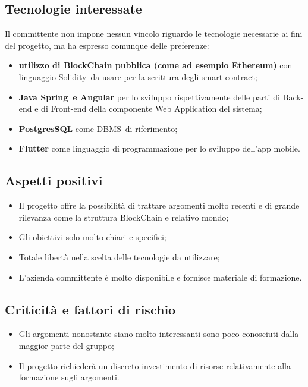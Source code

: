 \subsection{Tecnologie interessate}
Il committente non impone nessun vincolo riguardo le tecnologie necessarie ai fini del progetto, ma ha espresso comunque delle preferenze:
\begin{itemize}
	\item \textbf{utilizzo di BlockChain pubblica (come ad esempio Ethereum\glo)} con linguaggio Solidity\glo\ da usare per la scrittura degli {smart contract}\glo;
	\item \textbf{Java Spring\glo\ e Angular\glo} per lo sviluppo rispettivamente delle parti di Back-end e di Front-end della componente Web Application del sistema;
	\item \textbf{PostgresSQL\glo} come DBMS\glo\ di riferimento;
	\item \textbf{Flutter\glo} come linguaggio di programmazione per lo sviluppo dell'app mobile.
\end{itemize}

\subsection{Aspetti positivi}
\begin{itemize}
	\item Il progetto offre la possibilità di trattare argomenti molto recenti e di grande rilevanza come la struttura BlockChain e relativo mondo;
	\item Gli obiettivi solo molto chiari e specifici;
	\item Totale libertà nella scelta delle tecnologie da utilizzare;
	\item L'azienda committente è molto disponibile e fornisce materiale di formazione.
\end{itemize}

\subsection{Criticità e fattori di rischio}
\begin{itemize}
	\item Gli argomenti nonostante siano molto interessanti sono poco conosciuti dalla maggior parte del gruppo;
	\item Il progetto richiederà un discreto investimento di risorse relativamente alla formazione sugli argomenti.
\end{itemize}

